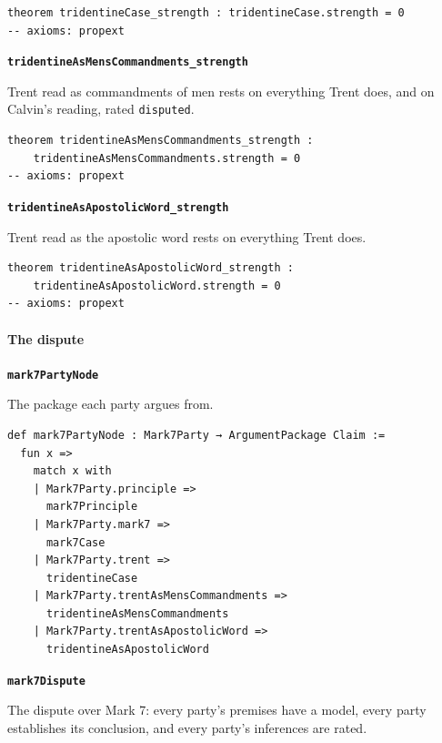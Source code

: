 \documentclass[11pt]{article}
\begin{document}
{\small\begin{verbatim}
theorem tridentineCase_strength : tridentineCase.strength = 0
-- axioms: propext
\end{verbatim}}
\par\medskip\noindent\textbf{\texttt{tridentine\allowbreak{}As\allowbreak{}Mens\allowbreak{}Commandments\_\allowbreak{}strength}}\par\nobreak\noindent
Trent read as commandments of men rests on everything Trent does, and on Calvin's reading, rated \texttt{disputed}.

{\small\begin{verbatim}
theorem tridentineAsMensCommandments_strength :
    tridentineAsMensCommandments.strength = 0
-- axioms: propext
\end{verbatim}}
\par\medskip\noindent\textbf{\texttt{tridentine\allowbreak{}As\allowbreak{}Apostolic\allowbreak{}Word\_\allowbreak{}strength}}\par\nobreak\noindent
Trent read as the apostolic word rests on everything Trent does.

{\small\begin{verbatim}
theorem tridentineAsApostolicWord_strength :
    tridentineAsApostolicWord.strength = 0
-- axioms: propext
\end{verbatim}}
\paragraph*{The dispute}
\leavevmode\par
\par\medskip\noindent\textbf{\texttt{mark7\allowbreak{}Party\allowbreak{}Node}}\par\nobreak\noindent
The package each party argues from.

{\small\begin{verbatim}
def mark7PartyNode : Mark7Party → ArgumentPackage Claim :=
  fun x =>
    match x with
    | Mark7Party.principle =>
      mark7Principle
    | Mark7Party.mark7 =>
      mark7Case
    | Mark7Party.trent =>
      tridentineCase
    | Mark7Party.trentAsMensCommandments =>
      tridentineAsMensCommandments
    | Mark7Party.trentAsApostolicWord =>
      tridentineAsApostolicWord
\end{verbatim}}
\par\medskip\noindent\textbf{\texttt{mark7\allowbreak{}Dispute}}\par\nobreak\noindent
The dispute over Mark 7: every party's premises have a model, every party establishes its conclusion, and every party's inferences are rated.
\end{document}
